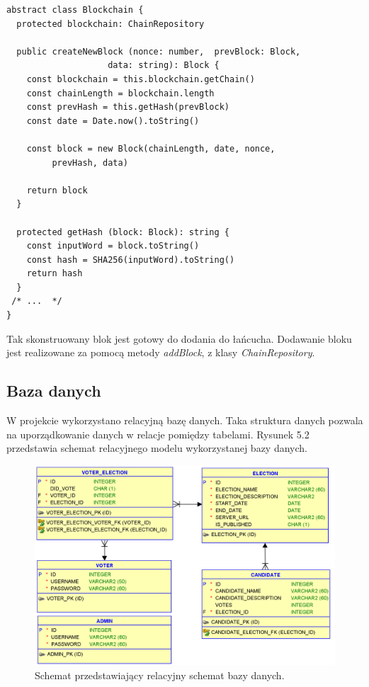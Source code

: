 \documentclass[a4paper,12pt]{book}
\begin{document}
\begin{lstlisting}[style=ES6, caption={Fragment klasy Blockchain.}]
abstract class Blockchain {
  protected blockchain: ChainRepository

  public createNewBlock (nonce: number,  prevBlock: Block, 
					data: string): Block {
    const blockchain = this.blockchain.getChain()
    const chainLength = blockchain.length
    const prevHash = this.getHash(prevBlock)
    const date = Date.now().toString()

    const block = new Block(chainLength, date, nonce,
		 prevHash, data)

    return block
  }

  protected getHash (block: Block): string {
    const inputWord = block.toString()
    const hash = SHA256(inputWord).toString()
    return hash
  }
 /* ...  */
}
\end{lstlisting}

Tak skonstruowany blok jest gotowy do dodania do łańcucha. Dodawanie bloku jest realizowane za pomocą metody \textit{addBlock}, z klasy \textit{ChainRepository}.

\subsection{Baza danych}

W projekcie wykorzystano relacyjną bazę danych. Taka struktura danych pozwala na uporządkowanie danych w relacje pomiędzy tabelami. Rysunek 5.2 przedstawia schemat relacyjnego modelu wykorzystanej bazy danych.

\begin{figure}[h]
    	\centering
	\includegraphics[width=\textwidth]{images/Relational.png}
	\caption{Schemat przedstawiający relacyjny schemat bazy danych.}
\end {figure}
\end{document}

